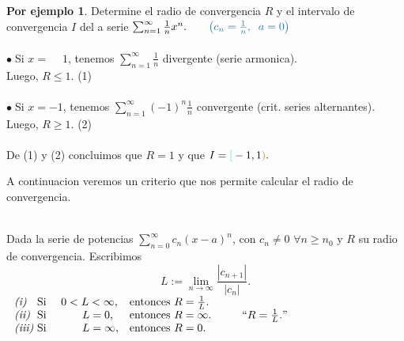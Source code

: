 \documentclass{article}
\theoremstyle{definition}
\theoremstyle{definition}
\newtheorem*{ej}{Por ejemplo}
\theoremstyle{remark}
\newcommand\bl{$\bullet\;$}
\begin{document}
\begin{ej}
  Determine el radio de convergencia $R$ y el intervalo de convergencia $I$ del a serie $\sum_{n=1}^{\infty}{\frac{1}{n}x^n}. \quad \quad \textcolor{azulp2}{\left(c_n=\frac{1}{n}, \; \; a=0\right)}$ \\ 
  \\
  \bl Si \textcolor{rojop2}{$x=\phantom{-}1$}, tenemos \textcolor{rojop2}{$\sum_{n=1}^{\infty}{\frac{1}{n}}$ divergente }(serie armonica). \\Luego, \textcolor{rojop2}{$R \leq 1$}. \textcolor{azulp2}{(1)} \\
  \\
  \bl Si \textcolor{verdep2}{$x=-1$}, tenemos \textcolor{verdep2}{$\sum_{n=1}^{\infty}{(-1)^n\frac{1}{n}}$ convergente }(crit. series alternantes). \\Luego, \textcolor{verdep2}{$R \geq 1$}. \textcolor{azulp2}{(2)} 
  \\\\
  De \textcolor{azulp2}{(1)} y  \textcolor{azulp2}{(2)} concluimos que $R=1$ y que $I=\textcolor{verdep2}{[}-1,1\textcolor{rojop2}{)}.$
\end{ej}

\pagebreak

A continuacion veremos un criterio que nos permite calcular el radio de convergencia.

\begin{teo} \; \\
  Dada la serie de potencias $\sum_{n=0}^{\infty}{c_n(x-a)^n}$, con $c_n \neq 0$\; $\forall n \geq n_0$ y $R$ su radio de convergencia. Escribimos \[ 
    L := \lim_{n\to\infty}{\frac{|c_{n+1}|}{|c_{n}|}}.
  \]
 $\left.
\begin{array}{lll}
  \emph{(i)\phantom{ii}} \text{ Si } & 0<L<\infty, & \text{entonces }R=\frac{1}{L}. \\
  \emph{(ii)\phantom{i}} \text{ Si} & \phantom{abcd}L=0, & \text{entonces }R=\infty. \\
  \emph{(iii)} \text{ Si } & \phantom{abcd}L=\infty, & \text{entonces }R=0.
\end{array}\right. \quad \quad ``R=\frac{1}{L}."$
\end{teo}
\end{document}

